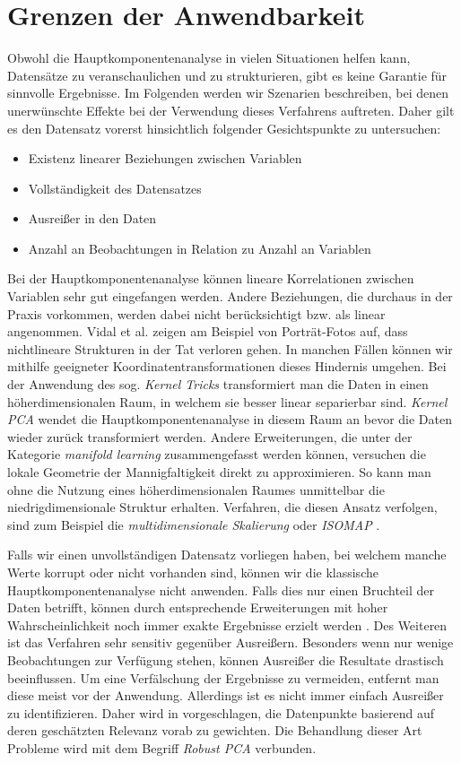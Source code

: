 \section{Grenzen der Anwendbarkeit} \label{theo_results}

Obwohl die Hauptkomponentenanalyse in vielen Situationen helfen kann, Datensätze zu veranschaulichen und zu strukturieren, gibt es keine Garantie für sinnvolle Ergebnisse. Im Folgenden werden wir Szenarien beschreiben, bei denen unerwünschte Effekte bei der Verwendung dieses Verfahrens auftreten. Daher gilt es den Datensatz vorerst hinsichtlich folgender Gesichtspunkte zu untersuchen: 

\begin{itemize}
\item Existenz linearer Beziehungen zwischen Variablen
\item Vollständigkeit des Datensatzes
\item Ausreißer in den Daten
\item Anzahl an Beobachtungen in Relation zu Anzahl an Variablen
\end{itemize}

Bei der Hauptkomponentenanalyse können lineare Korrelationen zwischen Variablen sehr gut eingefangen werden. Andere Beziehungen, die durchaus in der Praxis vorkommen, werden dabei nicht berücksichtigt bzw. als linear angenommen. Vidal et al. \cite{vidal} zeigen am Beispiel von Porträt-Fotos auf, dass nichtlineare Strukturen in der Tat verloren gehen. In manchen Fällen können wir mithilfe geeigneter Koordinatentransformationen dieses Hindernis umgehen. Bei der Anwendung des sog. \textit{Kernel Tricks} transformiert man die Daten in einen höherdimensionalen Raum, in welchem sie besser linear separierbar sind. \textit{Kernel PCA} wendet die Hauptkomponentenanalyse in diesem Raum an bevor die Daten wieder zurück transformiert werden. Andere Erweiterungen, die unter der Kategorie \textit{manifold learning} zusammengefasst werden können, versuchen die lokale Geometrie der Mannigfaltigkeit direkt zu approximieren. So kann man ohne die Nutzung eines höherdimensionalen Raumes unmittelbar die niedrigdimensionale Struktur erhalten. Verfahren, die diesen Ansatz verfolgen, sind zum Beispiel die \textit{multidimensionale Skalierung} oder \textit{ISOMAP} \cite{lee}.

Falls wir einen unvollständigen Datensatz vorliegen haben, bei welchem manche Werte korrupt oder nicht vorhanden sind, können wir die klassische Hauptkomponentenanalyse nicht anwenden. Falls dies nur einen Bruchteil der Daten betrifft, können durch entsprechende Erweiterungen mit hoher Wahrscheinlichkeit noch immer exakte Ergebnisse erzielt werden \cite{candes}. Des Weiteren ist das Verfahren sehr sensitiv gegenüber Ausreißern. Besonders wenn nur wenige Beobachtungen zur Verfügung stehen, können Ausreißer die Resultate drastisch beeinflussen. Um eine Verfälschung der Ergebnisse zu vermeiden, entfernt man diese meist vor der Anwendung. Allerdings ist es nicht immer einfach Ausreißer zu identifizieren. Daher wird in \cite{kriegel} vorgeschlagen, die Datenpunkte basierend auf deren geschätzten Relevanz vorab zu gewichten. Die Behandlung dieser Art Probleme wird mit dem Begriff \textit{Robust PCA} verbunden.


